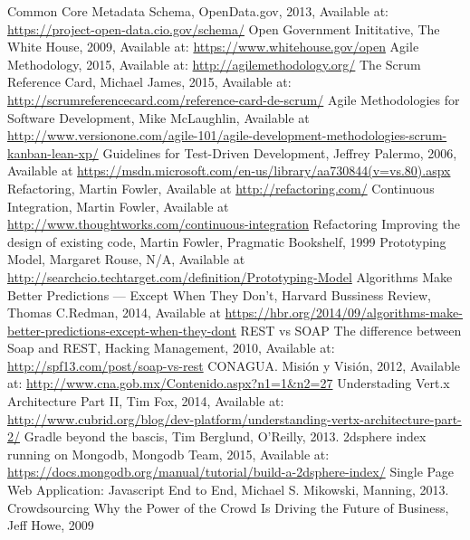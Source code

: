 \begin{thebibliography}{1}
    Common Core Metadata Schema, OpenData.gov, 2013, Available at: \url{https://project-open-data.cio.gov/schema/}
    Open Government Inititative, The White House, 2009, Available at: \url{https://www.whitehouse.gov/open}
    Agile Methodology, 2015, Available at: \url{http://agilemethodology.org/}
    The Scrum Reference Card, Michael James, 2015, Available at: \url{http://scrumreferencecard.com/reference-card-de-scrum/}
    Agile Methodologies for Software Development, Mike McLaughlin, Available at \url{http://www.versionone.com/agile-101/agile-development-methodologies-scrum-kanban-lean-xp/}
    Guidelines for Test-Driven Development, Jeffrey Palermo, 2006, Available at \url{https://msdn.microsoft.com/en-us/library/aa730844(v=vs.80).aspx}
    Refactoring, Martin Fowler, Available at \url{http://refactoring.com/}
    Continuous Integration, Martin Fowler, Available at \url{http://www.thoughtworks.com/continuous-integration}
     Refactoring \: Improving the design of existing code, Martin Fowler, Pragmatic Bookshelf, 1999
     Prototyping Model, Margaret Rouse, N/A, Available at \url{http://searchcio.techtarget.com/definition/Prototyping-Model}
    Algorithms Make Better Predictions — Except When They Don’t, Harvard Bussiness Review, Thomas C.Redman, 2014, Available at \url{https://hbr.org/2014/09/algorithms-make-better-predictions-except-when-they-dont}
    REST vs SOAP\: The difference between Soap and REST, Hacking Management, 2010, Available at: \url{http://spf13.com/post/soap-vs-rest}
    CONAGUA. Misión y Visión, 2012, Available at: \url{http://www.cna.gob.mx/Contenido.aspx?n1=1&n2=27}
    Understading Vert.x Architecture Part II, Tim Fox, 2014, Available at: \url{http://www.cubrid.org/blog/dev-platform/understanding-vertx-architecture-part-2/}
    Gradle beyond the bascis, Tim Berglund, O'Reilly, 2013.
    2dsphere index running on Mongodb, Mongodb Team, 2015, Available at: \url{https://docs.mongodb.org/manual/tutorial/build-a-2dsphere-index/}
    Single Page Web Application: Javascript End to End, Michael S. Mikowski, Manning, 2013.
    Crowdsourcing\: Why the Power of the Crowd Is Driving the Future of Business, Jeff Howe, 2009
\end{thebibliography}

